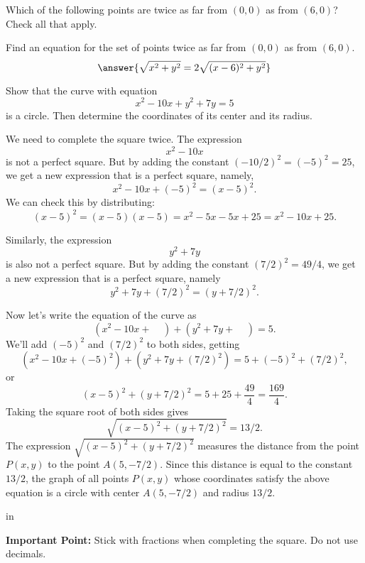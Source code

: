 \documentclass{ximera}
\newcommand{\pskip}{\vskip 0.1 in}
\begin{document}
\begin{exercise}  
  Which of the following points are twice as far from $(0,0)$ as from $(6,0)$? Check all that apply.  
  \begin{selectAll}  
     \end{selectAll}  
\end{exercise}  



\begin{question} 
Find an equation for the set of points twice as far from $(0,0)$ as from $(6,0)$. 
\[
  \answer{\sqrt{x^2+y^2} = 2 \sqrt{(x-6)^2+y^2}} 
\]
    \end{question}




\begin{example}
Show that the curve with equation
\[
   x^2  - 10x + y^2 + 7y = 5
\]
is a circle. Then determine the coordinates of its center and its radius.
\end{example}


\begin{explanation}
We need to complete the square twice. The expression
\[
     x^2 - 10x
\]
is not a perfect square. But by adding the constant $(-10/2)^2 = (-5)^2 = 25$, we get a new expression that is a perfect square, namely,
\[
     x^2 -10x + (-5)^2 = (x-5)^2 .
\]
We can check this by distributing:
\[
    (x-5)^2 = (x-5)(x-5) = x^2 -5x -5x + 25 = x^2 - 10x + 25 .
\]

Similarly, the expression
\[
   y^2 + 7y
\]
is also not a perfect square. But by adding the constant $(7/2)^2 = 49/4$, we get a new expression that is a perfect square, namely
\[
     y^2 + 7y + (7/2)^2 = (y+7/2)^2 .
\]

Now let's write the equation of the curve as
\[
     (x^2  - 10x + \;\;\;\; ) + (y^2 + 7y + \;\;\;\; ) = 5 .
\]
We'll add $(-5)^2$ and $(7/2)^2$ to both sides, getting
\[
     (x^2  - 10x + (-5)^2 ) + (y^2 + 7y + (7/2)^2 ) = 5 + (-5)^2 + (7/2)^2 ,
\]
or
\[
    (x-5)^2 + (y+7/2)^2 = 5 + 25 + \frac{49}{4} = \frac{169}{4} .
\]
Taking the square root of both sides gives
\[
    \sqrt{(x-5)^2 + (y+7/2)^2} = 13/2 .
\]
The expression $\sqrt{(x-5)^2 + (y+7/2)^2}$ measures the distance from the point $P(x,y)$ to the point $A(5,-7/2)$. Since this distance is equal to the constant $13/2$, the graph of all points $P(x,y)$ whose coordinates satisfy the above equation is a circle with center $A(5,-7/2)$ and radius $13/2$.

\pskip 

{\bf Important Point:} Stick with fractions when completing the square. Do not use decimals.

\end{explanation}
\end{document}
